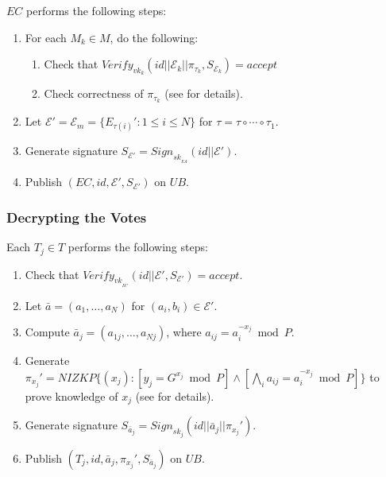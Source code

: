 \documentclass[bibtotoc,halfparskip,oneside]{scrreprt}
\newcommand{\eid}{\mathit{id}\xspace}
\newcommand{\sk}[1]{\mathit{sk}_{#1}\xspace}
\newcommand{\vk}[1]{\mathit{vk}_{#1}\xspace}
\newcommand{\SK}[1]{\sk{_#1}\xspace}
\newcommand{\VK}[1]{\vk{_#1}\xspace}
\newcommand{\EA}{\ensuremath{\mathit{EA}}\xspace}
\newcommand{\EC}{\ensuremath{\mathit{EC}}\xspace}
\newcommand{\UB}{\ensuremath{\mathit{UB}}\xspace}
\newcommand{\Tallier}[1]{\ensuremath{\mathit{T}_{#1}}\xspace}
\newcommand{\Mixer}[1]{\ensuremath{\mathit{M}_{#1}}\xspace}
\begin{document}
\EC performs the following steps:
\begin{enumerate}[resume]
	\item For each $\Mixer{k}\in M$, do the following:
	\begin{enumerate}
		\item Check that $\mathit{Verify}_{\vk{k}}(\eid||\mathcal{E}_k||\pi_{\tau_k},S_{\mathcal{E}_k})=\mathit{accept}$ 
		\item Check correctness of $\pi_{\tau_k}$ (see  for details).
	\end{enumerate}
	\item Let $\mathcal{E}'=\mathcal{E}_m=\{E_{\tau(i)}':1\leq i\leq N\}$ for $\tau=\tau\circ\cdots\circ\tau_1$.
	\item Generate signature $S_{\mathcal{E}'}=\mathit{Sign}_{\SK{\EA}}(\eid||\mathcal{E}')$.
	\item Publish $(\EC,\eid,\mathcal{E}',S_{\mathcal{E}'})$ on \UB.
\end{enumerate}

\subsubsection{Decrypting the Votes}
Each $\Tallier{j}\in T$ performs the following steps:
\begin{enumerate}
	\item Check that $\mathit{Verify}_{\VK{\EC}}(\eid||\mathcal{E}',S_{\mathcal{E}'})=\mathit{accept}$.
	\item Let $\bar{a}=(a_1,\ldots,a_N)$ for $(a_i,b_i)\in\mathcal{E}'$. 
	\item Compute $\bar{a}_j = (a_{1j},\ldots,a_{Nj})$, where $a_{ij} = a_i^{-x_j}\bmod{P}$.
	\item Generate $\pi_{x_j}'=\mathit{NIZKP}\{(x_j):[y_j=G^{x_j}\bmod{P}] \wedge \left[\bigwedge_i a_{ij} = a_i^{-x_j}\bmod{P}\right]\}$ to prove knowledge of $x_j$ (see  for details).
	\item Generate signature $S_{\bar{a}_j}=\mathit{Sign}_{\sk{j}}(\eid||\bar{a}_j||\pi_{x_j}')$.
	\item Publish $(\Tallier{j},\eid,\bar{a}_j,\pi_{x_j}',S_{\bar{a}_j})$ on \UB.
\end{enumerate}
\end{document}
